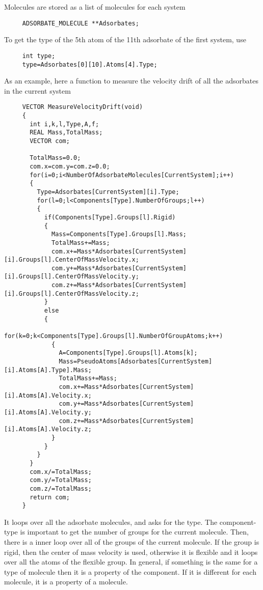 \noindent
Molecules are stored as a list of molecules for each system
\begin{footnotesize}
\begin{verbatim}
     ADSORBATE_MOLECULE **Adsorbates;
\end{verbatim}
\end{footnotesize}
To get the type of the 5th atom of the 11th adsorbate of the first system, use
\begin{verbatim}
     int type;
     type=Adsorbates[0][10].Atoms[4].Type;
\end{verbatim}
As an example, here a function to measure the velocity drift of all the adsorbates in the current system
\begin{footnotesize}
\begin{verbatim}
     VECTOR MeasureVelocityDrift(void)
     {
       int i,k,l,Type,A,f;
       REAL Mass,TotalMass;
       VECTOR com;

       TotalMass=0.0;
       com.x=com.y=com.z=0.0;
       for(i=0;i<NumberOfAdsorbateMolecules[CurrentSystem];i++)
       {
         Type=Adsorbates[CurrentSystem][i].Type;
         for(l=0;l<Components[Type].NumberOfGroups;l++)
         {
           if(Components[Type].Groups[l].Rigid)
           {
             Mass=Components[Type].Groups[l].Mass;
             TotalMass+=Mass;
             com.x+=Mass*Adsorbates[CurrentSystem][i].Groups[l].CenterOfMassVelocity.x;
             com.y+=Mass*Adsorbates[CurrentSystem][i].Groups[l].CenterOfMassVelocity.y;
             com.z+=Mass*Adsorbates[CurrentSystem][i].Groups[l].CenterOfMassVelocity.z;
           }
           else
           {
             for(k=0;k<Components[Type].Groups[l].NumberOfGroupAtoms;k++)
             {
               A=Components[Type].Groups[l].Atoms[k];
               Mass=PseudoAtoms[Adsorbates[CurrentSystem][i].Atoms[A].Type].Mass;
               TotalMass+=Mass;
               com.x+=Mass*Adsorbates[CurrentSystem][i].Atoms[A].Velocity.x;
               com.y+=Mass*Adsorbates[CurrentSystem][i].Atoms[A].Velocity.y;
               com.z+=Mass*Adsorbates[CurrentSystem][i].Atoms[A].Velocity.z;
             }
           }
         }
       }
       com.x/=TotalMass;
       com.y/=TotalMass;
       com.z/=TotalMass;
       return com;
     }
\end{verbatim}
\end{footnotesize}
It loops over all the adsorbate molecules, and asks for the type. The component-type is important to get the number of groups for the current molecule.
Then, there is a inner loop over all of the groups of the current molecule. If the group is rigid, then the center of mass velocity is used, otherwise
it is flexible and it loops over all the atoms of the flexible group.
In general, if something is the same for a type of molecule then it is a property of the component. If it is different for each molecule, it is a property
of a molecule.
